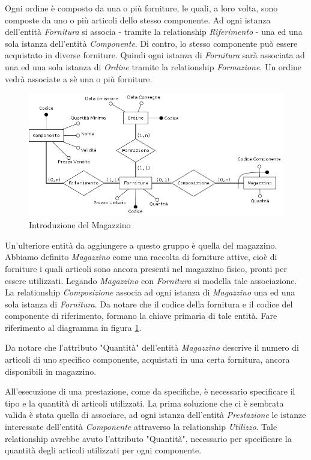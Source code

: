 			Ogni ordine è composto da una o più forniture, le quali, a loro volta, sono composte da uno o più articoli dello stesso componente. Ad ogni istanza dell'entità \emph{Fornitura} si associa - tramite la relationship \emph{Riferimento} - una ed una sola istanza dell'entità \emph{Componente}. Di contro, lo stesso componente può essere acquistato in diverse forniture.
			Quindi ogni istanza di \emph{Fornitura} sarà associata ad una ed una sola istanza di \emph{Ordine} tramite la relationship \emph{Formazione}. Un ordine vedrà associate a sè una o più forniture.
			
			\begin{figure}
				\centering
				\includegraphics[width=13cm]{images/finitures/componente_fornitura_ordine_magazzino.png}
				\caption{Introduzione del Magazzino}
				\label{fig:componente_fornitura_ordine_magazzino}
			\end{figure}
			
			Un'ulteriore entità da aggiungere a questo gruppo è quella del magazzino. Abbiamo definito \emph{Magazzino} come una raccolta di forniture attive, cioè di forniture i quali articoli sono ancora presenti nel magazzino fisico, pronti per essere utilizzati. Legando \emph{Magazzino} con \emph{Fornitura} si modella tale associazione. La relationship \emph{Composizione} associa ad ogni istanza di \emph{Magazzino} una ed una sola istanza di \emph{Fornitura}. Da notare che il codice della fornitura e il codice del componente di riferimento, formano la chiave primaria di tale entità.
			Fare riferimento al diagramma in figura \ref{fig:componente_fornitura_ordine_magazzino}.
			
			Da notare che l'attributo "Quantità" dell'entità \emph{Magazzino} descrive il numero di articoli di uno specifico componente, acquistati in una certa fornitura, ancora disponibili in magazzino.
			
			All'esecuzione di una prestazione, come da specifiche, è necessario specificare il tipo e la quantità di articoli utilizzati. La prima soluzione che ci è sembrata valida è stata quella di associare, ad ogni istanza dell'entità \emph{Prestazione} le istanze interessate dell'entità \emph{Componente} attraverso la relationship \emph{Utilizzo}. Tale relationship avrebbe avuto l'attributo "Quantità", necessario per specificare la quantità degli articoli utilizzati per ogni componente.
			
